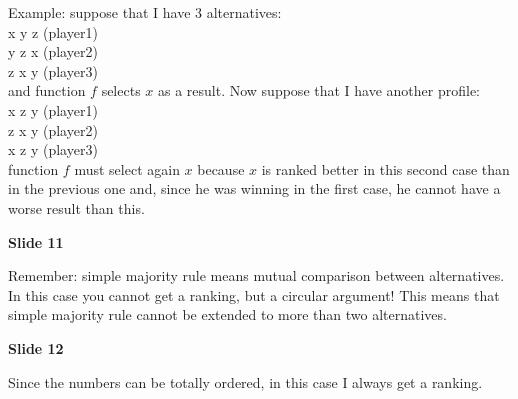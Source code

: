 \noindent Example: suppose that I have 3 alternatives:\\
x 	y 	z (player1)\\
y 	z	x (player2)\\
z	x 	y (player3)\\
and function $f$ selects $x$ as a result. Now suppose that I have another 
profile:\\
x 	z 	y (player1)\\
z 	x 	y (player2)\\
x 	z 	y (player3)\\
function $f$ must select again $x$ because $x$ is ranked better in this second 
case than in the previous one and, since he was winning in the first case, he 
cannot have a worse result than this.

\bigskip
\noindent \textbf{Slide 11}

\noindent Remember: simple majority rule means mutual comparison between 
alternatives. In this case you cannot get a ranking, but a circular argument! 
This means that simple majority rule cannot be extended to more than two 
alternatives.

\bigskip
\noindent \textbf{Slide 12}

\noindent Since the numbers can be totally ordered, in this case I always get 
a ranking.

%
